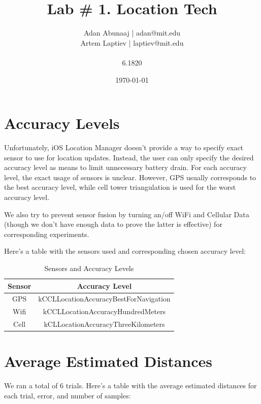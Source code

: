 \documentclass{lab}
\title{Lab \# 1. Location Tech} %
\author{Adan Abunaaj | adan@mit.edu \\ Artem Laptiev | laptiev@mit.edu \\\\ 6.1820} %
\date{\today} %
\begin{document}
\maketitle

\newpage

\section{Accuracy Levels}

Unfortunately, iOS Location Manager doesn't provide a way to specify exact sensor to use for location updates. Instead, the user can only specify the desired accuracy level as means to limit unnecessary battery drain. For each accuracy level, the exact usage of sensors is unclear. However, GPS usually corresponds to the best accuracy level, while cell tower triangulation is used for the worst accuracy level.

We also try to prevent sensor fusion by turning an/off WiFi and Cellular Data (though we don't have enough data to prove the latter is effective) for corresponding experiments.

Here's a table with the sensors used and corresponding chosen accuracy level:

\begin{table}[h!]
    \centering
    \begin{tabular}{|c|c|}
        \hline
        \textbf{Sensor} & \textbf{Accuracy Level} \\ \hline
        GPS & kCCLLocationAccuracyBestForNavigation \\ \hline
        Wifi & kCCLLocationAccuracyHundredMeters \\ \hline
        Cell & kCLLocationAccuracyThreeKilometers \\ \hline
    \end{tabular}
    \caption{Sensors and Accuracy Levels}
    \label{tab:accuracy}
\end{table}

\section{Average Estimated Distances}

We ran a total of 6 trials. Here's a table with the average estimated distances for each trial, error, and number of samples:
\end{document}
